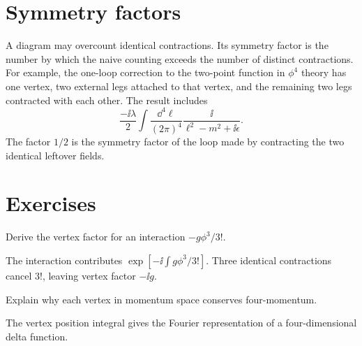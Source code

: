 \section{Symmetry factors}

A diagram may overcount identical contractions.  Its symmetry factor is the number by which the naive counting exceeds the number of distinct contractions.  For example, the one-loop correction to the two-point function in \(\phi^4\) theory has one vertex, two external legs attached to that vertex, and the remaining two legs contracted with each other.  The result includes
\[
  \frac{-\ii\lambda}{2}
  \int\frac{\dd^4\ell}{(2\pi)^4}
  \frac{\ii}{\ell^2-m^2+\ii\epsilon}.
\]
The factor \(1/2\) is the symmetry factor of the loop made by contracting the two identical leftover fields.

\section*{Exercises}

\begin{exercise}
Derive the vertex factor for an interaction \(-g\phi^3/3!\).
\begin{answer}
The interaction contributes \(\exp[-\ii\int g\phi^3/3!]\).  Three identical contractions cancel \(3!\), leaving vertex factor \(-\ii g\).
\end{answer}
\end{exercise}

\begin{exercise}
Explain why each vertex in momentum space conserves four-momentum.
\begin{answer}
The vertex position integral gives the Fourier representation of a four-dimensional delta function.
\end{answer}
\end{exercise}
